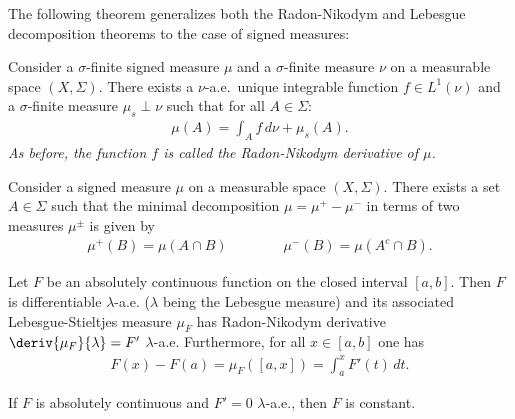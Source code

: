     The following theorem generalizes both the Radon-Nikodym and Lebesgue decomposition theorems to the case of signed measures:
    \begin{theorem}\label{lebesgue:signed_radon_nikodym}
        Consider a $\sigma$-finite signed measure $\mu$ and a $\sigma$-finite measure $\nu$ on a measurable space $(X,\Sigma)$. There exists a $\nu$-a.e.~unique integrable function $f\in L^1(\nu)$ and a $\sigma$-finite measure $\mu_s\perp\nu$ such that for all $A\in\Sigma$:
        \begin{gather}
            \mu(A) = \int_Af\,d\nu + \mu_s(A).
        \end{gather}
        \emph{As before, the function $f$ is called the Radon-Nikodym derivative of $\mu$.}
    \end{theorem}

    \begin{theorem}
        Consider a signed measure $\mu$ on a measurable space $(X,\Sigma)$. There exists a set $A\in\Sigma$ such that the minimal decomposition $\mu=\mu^+-\mu^-$ in terms of two measures $\mu^\pm$ is given by
        \begin{gather}
            \mu^+(B) = \mu(A\cap B)\qquad\qquad\mu^-(B)=\mu(A^c\cap B).
        \end{gather}
    \end{theorem}



    \begin{theorem}
        Let $F$ be an absolutely continuous function on the closed interval $[a,b]$. Then $F$ is differentiable $\lambda$-a.e. ($\lambda$ being the Lebesgue measure) and its associated Lebesgue-Stieltjes measure $\mu_F$ has Radon-Nikodym derivative $\deriv{\mu_F}{\lambda}=F'$ $\lambda$-a.e. Furthermore, for all $x\in[a,b]$ one has
        \begin{gather}
            F(x) - F(a) = \mu_F([a,x]) = \int_a^xF'(t)\,dt.
        \end{gather}
    \end{theorem}
    \begin{result}
        If $F$ is absolutely continuous and $F'=0$ $\lambda$-a.e., then $F$ is constant.
    \end{result}